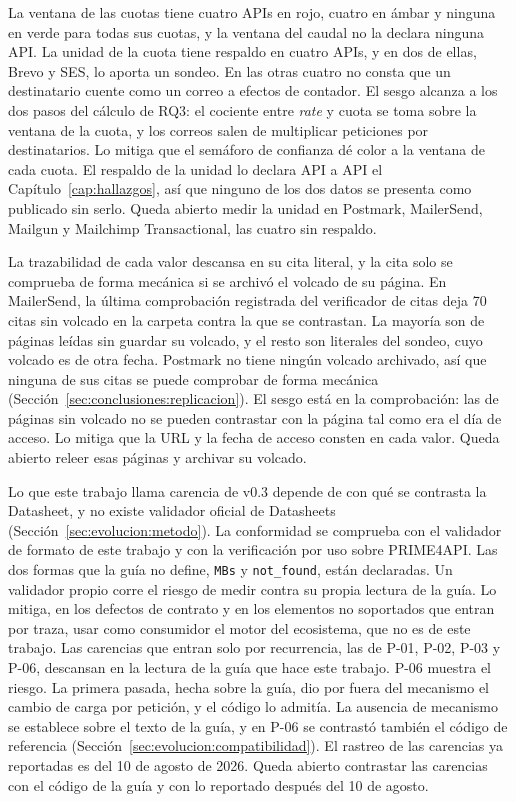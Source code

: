 La ventana de las cuotas tiene cuatro APIs en rojo, cuatro en ámbar y ninguna en verde para todas sus cuotas, y la ventana del caudal no la declara ninguna API.
La unidad de la cuota tiene respaldo en cuatro APIs, y en dos de ellas, Brevo y SES, lo aporta un sondeo.
En las otras cuatro no consta que un destinatario cuente como un correo a efectos de contador.
El sesgo alcanza a los dos pasos del cálculo de RQ3: el cociente entre \textit{rate} y cuota se toma sobre la ventana de la cuota, y los correos salen de multiplicar peticiones por destinatarios.
Lo mitiga que el semáforo de confianza dé color a la ventana de cada cuota.
El respaldo de la unidad lo declara API a API el Capítulo~\ref{cap:hallazgos}, así que ninguno de los dos datos se presenta como publicado sin serlo.
Queda abierto medir la unidad en Postmark, MailerSend, Mailgun y Mailchimp Transactional, las cuatro sin respaldo.

La trazabilidad de cada valor descansa en su cita literal, y la cita solo se comprueba de forma mecánica si se archivó el volcado de su página.
En MailerSend, la última comprobación registrada del verificador de citas deja 70 citas sin volcado en la carpeta contra la que se contrastan.
La mayoría son de páginas leídas sin guardar su volcado, y el resto son literales del sondeo, cuyo volcado es de otra fecha.
Postmark no tiene ningún volcado archivado, así que ninguna de sus citas se puede comprobar de forma mecánica (Sección~\ref{sec:conclusiones:replicacion}).
El sesgo está en la comprobación: las de páginas sin volcado no se pueden contrastar con la página tal como era el día de acceso.
Lo mitiga que la URL y la fecha de acceso consten en cada valor.
Queda abierto releer esas páginas y archivar su volcado.

Lo que este trabajo llama carencia de v0.3 depende de con qué se contrasta la Datasheet, y no existe validador oficial de Datasheets (Sección~\ref{sec:evolucion:metodo}).
La conformidad se comprueba con el validador de formato de este trabajo y con la verificación por uso sobre PRIME4API.
Las dos formas que la guía no define, \texttt{MBs} y \texttt{not\_found}, están declaradas.
Un validador propio corre el riesgo de medir contra su propia lectura de la guía.
Lo mitiga, en los defectos de contrato y en los elementos no soportados que entran por traza, usar como consumidor el motor del ecosistema, que no es de este trabajo.
Las carencias que entran solo por recurrencia, las de P-01, P-02, P-03 y P-06, descansan en la lectura de la guía que hace este trabajo.
P-06 muestra el riesgo.
La primera pasada, hecha sobre la guía, dio por fuera del mecanismo el cambio de carga por petición, y el código lo admitía.
La ausencia de mecanismo se establece sobre el texto de la guía, y en P-06 se contrastó también el código de referencia (Sección~\ref{sec:evolucion:compatibilidad}).
El rastreo de las carencias ya reportadas es del 10 de agosto de 2026.
Queda abierto contrastar las carencias con el código de la guía y con lo reportado después del 10 de agosto.

